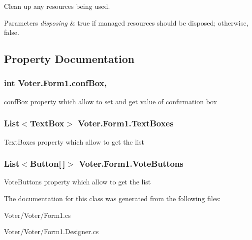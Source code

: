 Clean up any resources being used. 


\begin{DoxyParams}{Parameters}
{\em disposing} & true if managed resources should be disposed; otherwise, false.\\
\hline
\end{DoxyParams}


\subsection{Property Documentation}
\hypertarget{class_voter_1_1_form1_a1a9fce02a2bbdbf9d3008b02b3b79bae}{}
\subsubsection[{conf\+Box}]{\setlength{\rightskip}{0pt plus 5cm}int Voter.\+Form1.\+conf\+Box\hspace{0.3cm}{\ttfamily [get]}, {\ttfamily [set]}}\label{class_voter_1_1_form1_a1a9fce02a2bbdbf9d3008b02b3b79bae}


conf\+Box property which allow to set and get value of confirmation box 

\hypertarget{class_voter_1_1_form1_a5c5e90b6fa99ecbaec0ee5b7d48f4d1d}{}
\subsubsection[{Text\+Boxes}]{\setlength{\rightskip}{0pt plus 5cm}List$<$Text\+Box$>$ Voter.\+Form1.\+Text\+Boxes\hspace{0.3cm}{\ttfamily [get]}}\label{class_voter_1_1_form1_a5c5e90b6fa99ecbaec0ee5b7d48f4d1d}


Text\+Boxes property which allow to get the list 

\hypertarget{class_voter_1_1_form1_aa1ad45e2e705942b18168e5bb6a96d53}{}
\subsubsection[{Vote\+Buttons}]{\setlength{\rightskip}{0pt plus 5cm}List$<$Button\mbox{[}$\,$\mbox{]}$>$ Voter.\+Form1.\+Vote\+Buttons\hspace{0.3cm}{\ttfamily [get]}}\label{class_voter_1_1_form1_aa1ad45e2e705942b18168e5bb6a96d53}


Vote\+Buttons property which allow to get the list 



The documentation for this class was generated from the following files\+:\begin{DoxyCompactItemize}
\item 
Voter/\+Voter/Form1.\+cs\item 
Voter/\+Voter/Form1.\+Designer.\+cs\end{DoxyCompactItemize}
